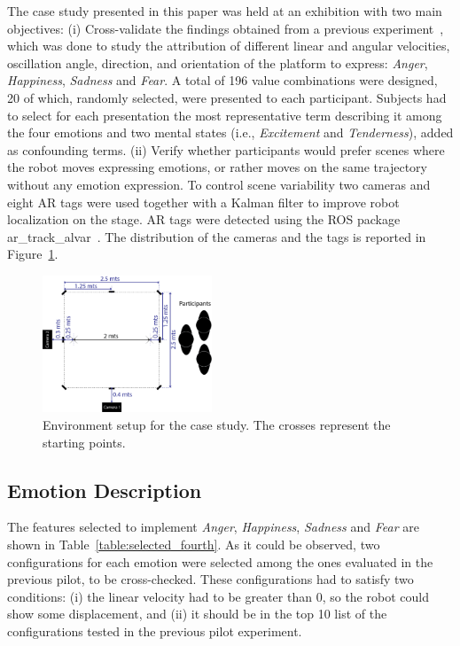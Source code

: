  The case study presented in this paper was held at an exhibition with two main objectives:
 (i) Cross-validate the findings obtained from a previous experiment~\cite{Angel2017-2}, which was done to study the attribution of different linear and angular velocities, oscillation angle, direction, and orientation of the platform to express: \textit{Anger}, \textit{Happiness}, \textit{Sadness} and \textit{Fear}. A total of 196 value combinations were designed, 20 of which, randomly selected, were presented to each participant. Subjects had to select for each presentation the most representative term describing it among the four emotions and two mental states (i.e., \textit{Excitement} and \textit{Tenderness}), added as confounding terms. (ii) Verify whether participants would prefer scenes where the robot moves expressing emotions, or rather moves on the same trajectory without any emotion expression. To control scene variability two cameras and eight AR tags were used together with a Kalman filter to improve robot localization on the stage. AR tags were detected using the ROS package ar\_track\_alvar~\cite{artag2015}. The distribution of the cameras and the tags is reported in Figure~\ref{fig:setup_fourth}.

\begin{figure}
	\centering
	\includegraphics[width=0.45\textwidth]{./Images/FourthCase.png} 
	\caption{Environment setup for the case study. The crosses represent the starting points.}
	\label{fig:setup_fourth}
\end{figure}

\subsection{Emotion Description}

The features selected to implement \textit{Anger}, \textit{Happiness}, \textit{Sadness} and \textit{Fear} are shown in Table~\ref{table:selected_fourth}. As it could be observed, two configurations for each emotion were selected among the ones evaluated in the previous pilot, to be cross-checked. These configurations had to satisfy two conditions: (i) the linear velocity had to be greater than $0$, so the robot could show some displacement, and (ii) it should be in the top 10 list of the configurations tested in the previous pilot experiment.

